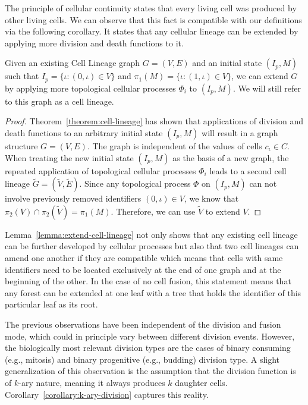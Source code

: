 The principle of cellular continuity states that every living cell was produced by other living
cells.
We can observe that this fact is compatible with our definitions via the following corollary.
It states that any cellular lineage can be extended by applying more division and death functions to
it.
\begin{lemma}
    Given an existing Cell Lineage graph $G=(V,E)$ and an initial state $(I_p,M)$ such that
    $I_p=\{\iota:(0,\iota)\in V\}$ and $\pi_1(M)=\{\iota:(1,\iota)\in V\}$, we can extend $G$ by
    applying more topological cellular processes $\Phi_i$ to $(I_p,M)$.
    We will still refer to this graph as a cell lineage.
    \label{lemma:extend-cell-lineage}
\end{lemma}

\begin{proof}
    Theorem~\ref{theorem:cell-lineage} has shown that applications of division and death functions
    to an arbitrary initial state $(I_p,M)$ will result in a graph structure $G=(V,E)$.
    The graph is independent of the values of cells $c_\iota\in C$.
    When treating the new initial state $(I_p,M)$ as the basis of a new graph, the repeated
    application of topological cellular processes $\Phi_i$ leads to a second cell lineage
    $\tilde{G}=(\tilde{V},\tilde{E})$.
    Since any topological process $\Phi$ on $(I_p,M)$ can not involve previously removed identifiers
    $(0,\iota)\in V$, we know that $\pi_2(V)\cap\pi_2(\tilde{V})=\pi_1(M)$.
    Therefore, we can use $\tilde{V}$ to extend $V$.
\end{proof}

Lemma~\ref{lemma:extend-cell-lineage} not only shows that any existing cell lineage can be
further developed by cellular processes but also that two cell lineages can amend one another if
they are compatible which means that cells with same identifiers need to be located exclusively at
the end of one graph and at the beginning of the other.
In the case of no cell fusion, this statement means that any forest can be extended at one leaf
with a tree that holds the identifier of this particular leaf as its root.

The previous observations have been independent of the division and fusion mode, which could in
principle vary between different division events.
However, the biologically most relevant division types are the cases of binary consuming (e.g.,
mitosis) and binary progenitive (e.g., budding) division type.
A slight generalization of this observation is the assumption that the division function is of
$k$-ary nature, meaning it always produces $k$ daughter cells.
Corollary~\ref{corollary:k-ary-division} captures this reality.

